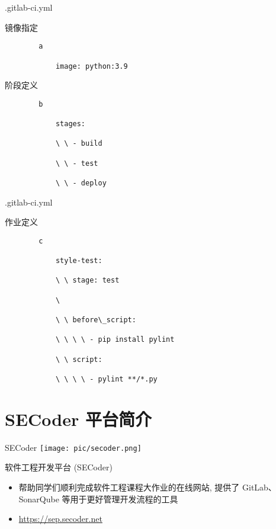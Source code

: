 \documentclass{beamer}
\begin{document}
\begin{frame}{.gitlab-ci.yml}
    \begin{block}{镜像指定}
        \begin{lstlisting}
        a
        
            image: python:3.9
        \end{lstlisting}
    \end{block}
    \begin{block}{阶段定义}
        \begin{lstlisting}
        b
        
            stages:
            
            \ \ - build
            
            \ \ - test
            
            \ \ - deploy
        \end{lstlisting}
    \end{block}
\end{frame}

\begin{frame}{.gitlab-ci.yml}
    \begin{block}{作业定义}
        \begin{lstlisting}
        c
        
            style-test:
            
            \ \ stage: test
            
            \ 
            
            \ \ before\_script:
            
            \ \ \ \ - pip install pylint
            
            \ \ script:
            
            \ \ \ \ - pylint **/*.py
        \end{lstlisting}
    \end{block}
\end{frame}

\section{SECoder 平台简介}

\begin{frame}{SECoder}
    \centering\texttt{[image: pic/secoder.png]}
    \begin{block}{软件工程开发平台 (SECoder)}
        \begin{itemize}
            \item 帮助同学们顺利完成软件工程课程大作业的在线网站, 提供了 GitLab、SonarQube 等用于更好管理开发流程的工具
            \item \url{https://sep.secoder.net}
        \end{itemize}
    \end{block}
\end{frame}
\end{document}
